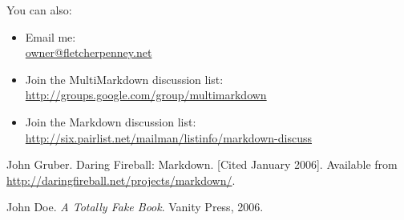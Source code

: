 You can also:

\begin{itemize}
\item Email me:\\
\href{mailto:owner@fletcherpenney.net}{owner@fletcherpenney.net}

\item Join the MultiMarkdown discussion list:\\
\href{http://groups.google.com/group/multimarkdown}{http:\slash \slash groups.google.com\slash group\slash multimarkdown}

\item Join the Markdown discussion list:\\
\href{http://six.pairlist.net/mailman/listinfo/markdown-discuss}{http:\slash \slash six.pairlist.net\slash mailman\slash listinfo\slash markdown-discuss}

\end{itemize}

\begin{thebibliography}{0}

John Gruber. Daring Fireball: Markdown. [Cited January 2006].
 Available from \href{http://daringfireball.net/projects/markdown/}{http:\slash \slash daringfireball.net\slash projects\slash markdown\slash }.


John Doe. \emph{A Totally Fake Book}. Vanity Press, 2006.


\end{thebibliography}




